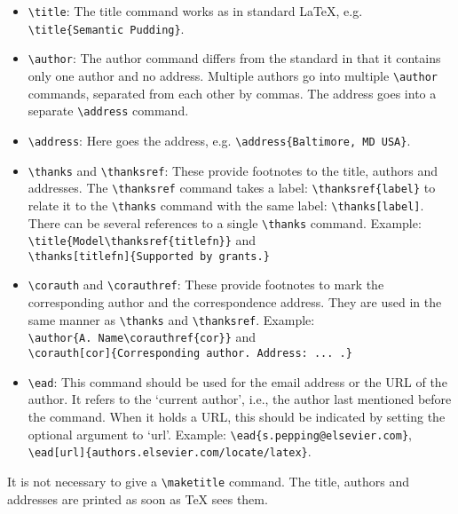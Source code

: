 \documentclass{elsart3p}    %
\begin{document}
\begin{itemize}

\item \verb|\title|: The title command works as in standard
\LaTeX, e.g.  \verb|\title{Semantic Pudding}|.

\item \verb|\author|: The author command differs from the
standard in that it contains only one author and no address.
Multiple authors go into multiple \verb|\author| commands,
separated from each other by commas.  The address goes into
a separate \verb|\address| command. 

\item \verb|\address|: Here goes the address,
e.g. \verb|\address{Baltimore, MD USA}|.

\item \verb|\thanks| and \verb|\thanksref|: 
These provide footnotes to the title, authors and addresses. 
The \verb|\thanksref| command takes a label: \verb|\thanksref{label}|
to relate it to the \verb|\thanks| command with 
the same label: \verb|\thanks[label]|. There can be several
references to a single \verb|\thanks| command. Example:\\
\verb|\title{Model\thanksref{titlefn}}| and\\
\verb|\thanks[titlefn]{Supported by grants.}|

\item \verb|\corauth| and \verb|\corauthref|: 
These provide footnotes to mark the corresponding author and the
correspondence address. They are used in the same manner as
\verb|\thanks| and \verb|\thanksref|. Example:\\
\verb|\author{A. Name\corauthref{cor}}| and\\
\verb|\corauth[cor]{Corresponding author. Address: ... .}|

\item \verb|\ead|:
This command should be used for the email address or the URL of the
author. It refers to the `current author', i.e., the author last
mentioned before the command.
When it holds a URL, this should be indicated by setting the
optional argument to `url'. Example:
\verb|\ead{s.pepping@elsevier.com}|,
\verb|\ead[url]{authors.elsevier.com/locate/latex}|.

\end{itemize}

It is not necessary to give a \verb|\maketitle| command. The title,
authors and addresses are printed as soon as \TeX{} sees them.
\end{document}

